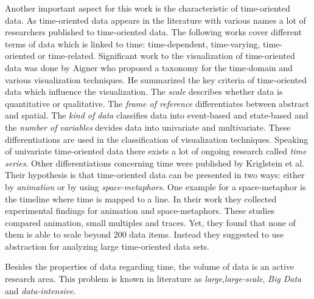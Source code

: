Another important aspect for this work is the characteristic of time-oriented data. As time-oriented data appears in the literature with various names a lot of researchers published to time-oriented data. The following works cover different terms of data which is linked to time:  time-dependent\cite{Postfach2003, Tominski2005,Kriglstein2014,Aigner2007,VanBuuren2001,FerreiradeOliveira2003,Yang2003,Chung2014,Rind2011}, time-varying\cite{Moere2004}, time-oriented\cite{Aigner2008,Aigner2007,Aigner2011,Hinum2005,Walker} or time-related\cite{Keimc}. Significant work to the visualization of time-oriented data was done by Aigner\cite{Aigner2011,Aigner2008,Aigner2007} who proposed a taxonomy for the time-domain and various visualization techniques. He summarized the key criteria of time-oriented data which influence the visualization. The \textit{scale} describes whether data is quantitative or qualitative. The \textit{frame of reference} differentiates between abstract and spatial. The \textit{kind of data} classifies data into event-based and state-based and the \textit{number of variables} devides data into univariate and multivariate. These differentiations are used in the classification of visualization techniques.  Speaking of univariate time-oriented data there exists a lot of ongoing research called \textit{time series}\cite{Aigner2011, Buono, Walker,Leonard,Chen1993,Esling2012}.
Other differentiations concerning time were published by Kriglstein et al\cite{Kriglstein2014}. Their hypothesis is that time-oriented data can be presented in two ways: either by \textit{animation} or by using \textit{space-metaphors}. One example for a space-metaphor is the timeline where time is mapped to a line. In their work they collected experimental findings for animation and space-metaphors. These studies compared animation, small multiples and traces. Yet, they found that none of them is able to scale beyond 200 data items\cite{Robertson2013}. Instead they suggested to use abstraction for analyzing large time-oriented data sets. 
\par
Besides the properties of data regarding time, the volume of data is an active research area. This problem is known in literature as
\textit{large}\cite{PiringerHarald2011,Keim2001,Keim1996,tennekes2013visualizing, Yang2003, Keim2005, Wickham2013},\textit{large-scale}\cite{Leonard,PiringerHarald2011,Cuzzocrea,Keim2005}, \textit{Big Data}\cite{Patil,KeaheyUsingData,chen2012business} and \textit{data-intensive}\cite{PhilipChen2014,S.MD.MUJEEB2005}.
